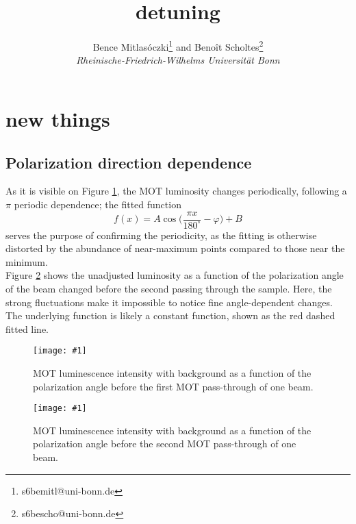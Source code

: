 \documentclass[twocolumn]{article}
\title{\textbf{detuning}}
\author{Bence Mitlasóczki\thanks{s6bemitl@uni-bonn.de} and Beno\^it Scholtes\thanks{s6bescho@uni-bonn.de} \\ \textit{Rheinische-Friedrich-Wilhelms Universit\"at Bonn}}
\newcommand{\insertFigure}[1]{%
   \texttt{[image: \#1]}%
}
\begin{document}
\section{new things}
\subsection{Polarization direction dependence}
As it is visible on Figure \ref{fig:Waveplate}, the MOT luminosity changes periodically, following a $\pi$ periodic dependence; the fitted function
\begin{equation}
f(x) = A \cos\big(\frac{\pi x}{180^{\circ}} - \varphi \big) + B \nonumber
\end{equation}
serves the purpose of confirming the periodicity, as the fitting is otherwise distorted by the abundance of near-maximum points compared to those near the minimum.\\
Figure \ref{fig:Waveplate2} shows the unadjusted luminosity as a function of the polarization angle of the beam changed before the second passing through the sample. Here, the strong fluctuations make it impossible to notice fine angle-dependent changes. The underlying function is likely a constant function, shown as the red dashed fitted line.
\begin{figure}
\centering
\insertFigure{Images/Waveplate1_w_fit.png}
\caption{MOT luminescence intensity with background as a function of the polarization angle before the first MOT pass-through of one beam.}
\label{fig:Waveplate}
\end{figure}
\begin{figure}
\centering
\insertFigure{Images/Waveplate2.png}
\caption{MOT luminescence intensity with background as a function of the polarization angle before the second MOT pass-through of one beam.}
\label{fig:Waveplate2}
\end{figure}
\end{document}
